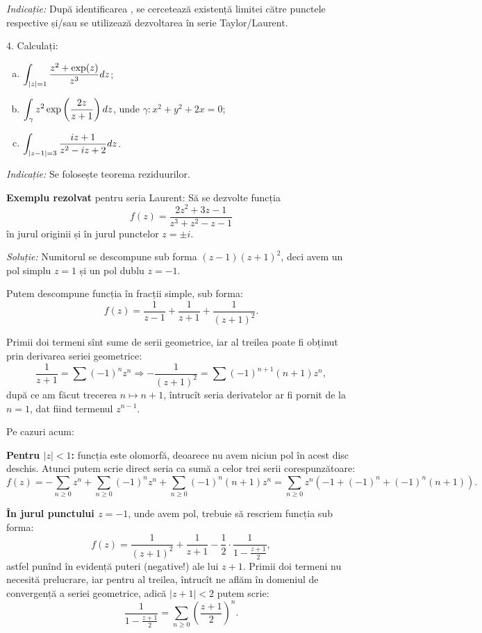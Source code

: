 \emph{Indicație:} După identificarea , se cercetează
existență limitei către punctele respective și/sau se utilizează dezvoltarea
în serie Taylor/Laurent.

\vspace{0.3cm}

4. Calculați:
\begin{enumerate}[(a)]
\item $ \displaystyle\int_{|z| = 1} \dfrac{z^2 + \exp(z)}{z^3} dz $;
\item $ \displaystyle\int_\gamma z^2 \exp\left(\dfrac{2z}{z+1}\right) dz $, unde
  $ \gamma: x^2 + y^2 + 2x = 0 $;
\item $ \displaystyle\int_{|z - 1| = 3} \dfrac{iz + 1}{z^2 - iz + 2} dz $.
\end{enumerate}

\emph{Indicație:} Se folosește teorema reziduurilor.

\vspace{0.3cm}

\textbf{Exemplu rezolvat} pentru seria Laurent: Să se dezvolte funcția
\[
  f(z) = \dfrac{2z^2 + 3z - 1}{z^3 + z^2 - z - 1}
\]
în jurul originii și în jurul punctelor $ z = \pm i $.

\emph{Soluție:} Numitorul se descompune sub forma $ (z - 1)(z + 1)^2 $,
deci avem un pol simplu $ z = 1 $ și un pol dublu $ z = - 1 $.

Putem descompune funcția în fracții simple, sub forma:
\[
  f(z) = \dfrac{1}{z - 1} + \dfrac{1}{z + 1} + \dfrac{1}{(z + 1)^2}.
\]

Primii doi termeni sînt sume de serii geometrice, iar al treilea poate
fi obținut prin derivarea seriei geometrice:
\[
  \dfrac{1}{z + 1} = \sum (-1)^n z^n \Rightarrow %
  -\dfrac{1}{(z + 1)^2} = \sum (-1)^{n+1} (n + 1) z^n,
\]
după ce am făcut trecerea $ n \mapsto n + 1 $, întrucît seria derivatelor
ar fi pornit de la $ n = 1 $, dat fiind termenul $ z^{n-1} $.

Pe cazuri acum:

\textbf{Pentru $ |z| < 1 $:} funcția este olomorfă, deoarece nu avem
niciun pol în acest disc deschis. Atunci putem scrie direct seria ca sumă
a celor trei serii corespunzătoare:
\[
  f(z) = -\sum_{n \geq 0} z^n + \sum_{n \geq 0} (-1)^n z^n + %
  \sum_{n \geq 0} (-1)^n (n + 1)z^n = %
  \sum_{n \geq 0} z^n \left( -1 + (-1)^n + (-1)^n(n + 1)\right).
\]

\textbf{În jurul punctului $ z = - 1 $}, unde avem pol,
trebuie să rescriem funcția sub forma:
\[
  f(z) = \dfrac{1}{(z + 1)^2} + \dfrac{1}{z + 1} - %
  \dfrac{1}{2} \cdot \dfrac{1}{1 - \frac{z + 1}{2}},
\]
astfel punînd în evidență puteri (negative!) ale lui $ z + 1 $. Primii doi
termeni nu necesită prelucrare, iar pentru al treilea, întrucît
ne aflăm în domeniul de convergență a seriei geometrice, adică $ |z + 1| < 2 $
putem scrie:
\[
  \dfrac{1}{1 - \frac{z + 1}{2}} = \sum_{n \geq 0} \left( \dfrac{z + 1}{2} \right)^n.
\]

